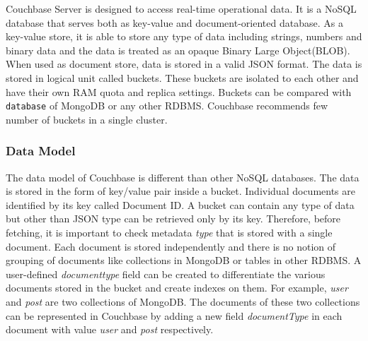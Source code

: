  Couchbase Server is designed to access real-time operational data. It is a NoSQL database that serves both as key-value and document-oriented database. As a key-value store, it is able to store any type of data including  strings, numbers and binary data and the data is treated as an opaque Binary Large Object(BLOB). When used as document store, data is stored in a valid JSON format. The data is stored in logical unit called buckets. These buckets are isolated to each other and have their own RAM quota and replica settings. Buckets can be compared with \texttt{database} of MongoDB or any other RDBMS. Couchbase recommends few number of buckets in a single cluster.
 
 \subsubsection{Data Model}%
 
The data model of Couchbase is different than other NoSQL databases. The data is stored in the form of key/value pair inside a bucket. Individual documents are identified by its key called Document ID. A bucket can contain any type of data but other than JSON type can be retrieved only by its key. Therefore, before fetching, it is important to check metadata \textit{type} that is stored with a single document. Each document is stored independently and there is no notion of grouping of documents like collections in MongoDB or tables in other RDBMS. A user-defined \textit{documenttype} field can be created to differentiate the various documents stored in the bucket and  create indexes on them.  For example, \textit{user} and \textit{post} are two collections of MongoDB. The documents of these two collections can be represented in Couchbase by adding a new field \textit{documentType}  in each document with value \textit{user} and \textit{post} respectively. 

